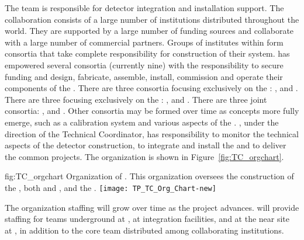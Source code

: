 The  team is responsible for detector integration
and installation support. 
The  collaboration consists of a large number of
institutions distributed throughout the world. They are supported by a
large number of funding sources and collaborate with a large number of
commercial partners. Groups of institutes within  form
consortia that take complete responsibility for construction of their
system.   has empowered several consortia (currently nine)
with the responsibility to secure funding and design, fabricate,
assemble, install, commission and operate their components of the
 . There are three consortia focusing
exclusively on the : ,
\single {} and \single {}. There are three
focusing exclusively on the : 
, \dual {} and \dual {}. There are
three joint consortia: ,  and . Other consortia may
be formed over time as concepts more fully emerge, such as a
 calibration system and various aspects of the .
 , under the direction of the
Technical Coordinator, has responsibility to monitor the
technical aspects of the detector construction, to integrate and
install the  and to deliver the common projects. The
  organization is shown in Figure~\ref{fig:TC_orgchart}.

\begin{dunefigure}{fig:TC_orgchart}
  {Organization of . This organization
 oversees the construction of the , both \single and
 \dual, and the .}
\texttt{[image: TP\_TC\_Org\_Chart-new]}
\end{dunefigure}


The  organization staffing will grow over time as the project
advances.  will provide staffing for teams underground at \surf, at
integration facilities, and at the near site at \fnal, in addition to
the core team distributed among collaborating institutions.

